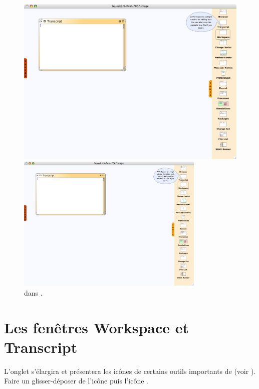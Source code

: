 \documentclass[a4paper,10pt,twoside]{book}
\begin{document}
\begin{figure}[htb]
\ifluluelse
	{\centerline {\includegraphics[width=\textwidth]{Tools}}}
	{\centerline {\includegraphics[width=0.8\textwidth]{Tools}}}
\caption{\Toolsflap dans \sq.\label{fig:tools}}
\end{figure}

\section{Les fenêtres Workspace et Transcript}
\label{sec:transcript}

L'onglet s'élargira et présentera les icônes de certains outils
importants de \sq (voir ). Faire un glisser-déposer de l'icône  puis l'icône .
\end{document}
